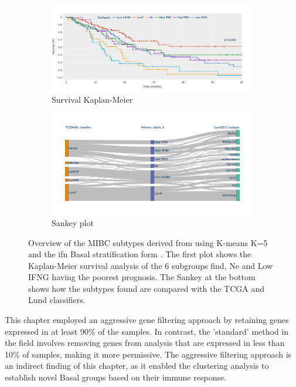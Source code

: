 \begin{figure}[!htb]
    \centering
    \begin{subfigure}[!t]{1.0\textwidth}
        \includegraphics[width=\textwidth,keepaspectratio]{Sections/ClusteringAnalysis/Resources/discussion/survival_K_6.png}    
        \caption{Survival Kaplan-Meier}
        \label{fig:cs:overview_survival}
    \end{subfigure}
    \centering
    \begin{subfigure}[!t]{1.0\textwidth}
        \includegraphics[width=\textwidth,keepaspectratio]{Sections/ClusteringAnalysis/Resources/discussion/KMeans_6_comp.png}
        \caption{Sankey plot}
        \label{fig:cs:overview_comp}
    \end{subfigure} 
    \centering
    \caption{Overview of the MIBC subtypes derived from using K-means K=5 and the \acrshort{ifn} Basal stratification form \citet{Baker2022-bj}. The first plot shows the Kaplan-Meier survival analysis of the 6 subgroups find, Ne and Low IFNG having the poorest prognosis. The Sankey at the bottom shows how the subtypes found are compared with the TCGA \citet{Robertson2017-mg} and Lund \citet{Marzouka2018-ge} classifiers.} 
    \label{fig:cs:overview_K_means_6}
\end{figure}


This chapter employed an aggressive gene filtering approach by retaining genes expressed in at least 90\% of the samples. In contrast, the 'standard' method in the field involves removing genes from analysis that are expressed in less than 10\% of samples, making it more permissive. The aggressive filtering approach is an indirect finding of this chapter, as it enabled the clustering analysis to establish novel Basal groups based on their immune response.

